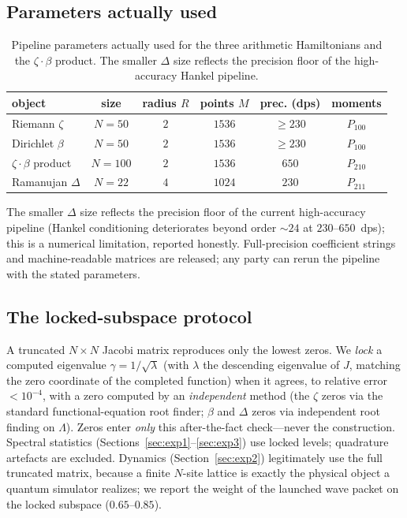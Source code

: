 \documentclass[aps,prx,reprint,floatfix]{revtex4-2}
\begin{document}
\subsection{Parameters actually used}
\begin{table}[t]
\centering
\footnotesize
\caption{Pipeline parameters actually used for the three arithmetic Hamiltonians and the $\zeta\cdot\beta$ product. The smaller $\Delta$ size reflects the precision floor of the high-accuracy Hankel pipeline.}
\label{tab:params}
\begin{tabular}{lccccc}
\toprule
object & size & radius $R$ & points $M$ & prec. (dps) & moments \\
\midrule
Riemann $\zeta$   & $N=50$ & $2$ & $1536$ & $\ge 230$ & $P_{100}$ \\
Dirichlet $\beta$ & $N=50$ & $2$ & $1536$ & $\ge 230$ & $P_{100}$ \\
$\zeta\cdot\beta$ product & $N=100$ & $2$ & $1536$ & $650$ & $P_{210}$ \\
Ramanujan $\Delta$ & $N=22$ & $4$ & $1024$ & $230$ & $P_{211}$ \\
\bottomrule
\end{tabular}
\end{table}
The smaller $\Delta$ size reflects the precision floor of the current
high-accuracy pipeline (Hankel conditioning deteriorates beyond order
$\sim 24$ at $230$--$650$~dps); this is a numerical limitation, reported
honestly. Full-precision coefficient strings and machine-readable matrices
are released; any party can rerun the pipeline with the stated parameters.

\subsection{The locked-subspace protocol}
\label{sec:lock}
A truncated $N\times N$ Jacobi matrix reproduces only the lowest zeros. We
\emph{lock} a computed eigenvalue $\gamma=1/\sqrt{\lambda}$ (with
$\lambda$ the descending eigenvalue of $J$, matching the zero coordinate of
the completed function) when it agrees, to relative error $<10^{-4}$, with a
zero computed by an \emph{independent} method (the $\zeta$ zeros via the
standard functional-equation root finder; $\beta$ and $\Delta$ zeros via
independent root finding on $\Lambda$). Zeros enter \emph{only} this
after-the-fact check---never the construction. Spectral statistics
(Sections~\ref{sec:exp1}--\ref{sec:exp3}) use locked levels; quadrature
artefacts are excluded. Dynamics (Section~\ref{sec:exp2}) legitimately use
the full truncated matrix, because a finite $N$-site lattice is exactly the
physical object a quantum simulator realizes; we report the weight of the
launched wave packet on the locked subspace ($0.65$--$0.85$).
\end{document}
